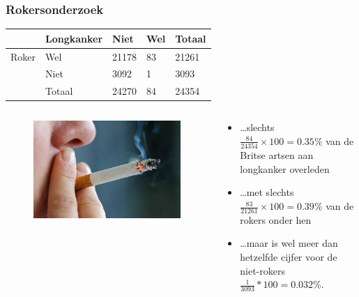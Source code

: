 \documentclass{beamer}
\begin{document}
\begin{frame}
  \frametitle{Rokersonderzoek}
  \begin{table}[h]
\begin{tabular}{@{}lllll@{}}
\toprule
      & \textbf{Longkanker} & \textbf{Niet} & \textbf{Wel} & \textbf{Totaal} \\ \midrule
Roker & Wel                 & 21178         & 83           & 21261           \\
      & Niet                & 3092          & 1            & 3093            \\
      & Totaal              & 24270         & 84           & 24354           \\ \bottomrule
\end{tabular}
\end{table}

\begin{columns}
  \begin{column}{0.3 \textwidth}

  \begin{figure}
    \centering
      \includegraphics[width=1.00\textwidth]{img/les-6-smoking.jpg}
  \end{figure}

  \end{column}
  \begin{column}{0.7 \textwidth}

  \begin{itemize}
    \item \dots slechts $\frac{84}{ 24354} \times 100 = 0.35\% $ van de Britse artsen aan longkanker overleden
    \item \dots met slechts $\frac{83}{21261} \times 100 = 0.39\%$ van de rokers onder hen
    \item \dots maar  is wel  meer dan hetzelfde cijfer voor de niet-rokers $\frac{1}{3093} * 100 = 0.032\%$.
  \end{itemize}
  \end{column}
\end{columns}
\end{frame}
\end{document}
